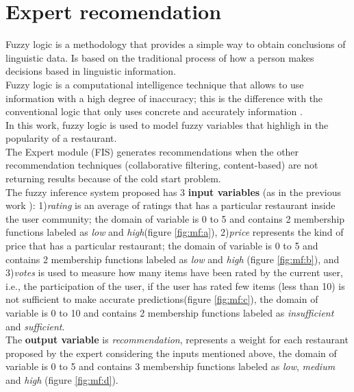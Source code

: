 \section{Expert recomendation} 

Fuzzy logic is a methodology that provides a simple way to obtain
conclusions of linguistic data. Is based on the traditional process of
how a person makes decisions based in linguistic information. \\    Fuzzy
logic is a computational intelligence technique that allows to use
information with a high degree of inaccuracy; this is the difference
with the conventional logic that only uses concrete and accurately
information \cite{zedeh1989knowledge}.\\  In this work, fuzzy logic is
used to model fuzzy variables that highligh in the popularity of a
restaurant.\\   
The Expert module (FIS) generates recommendations when the other
recommendation techniques (collaborative filtering, content-based) are
not returning results because of the cold start problem.\\   The fuzzy
inference system proposed has 3 \textbf{input variables} (as 
in the previous work \cite{garcia2009hybrid}): 1)\textit{rating} is
an average of ratings that has a particular restaurant inside the user
community; the domain of variable is 0 to 5 and contains 2 membership
functions labeled as \textit{low} and \textit{high}(figure
\ref{fig:mf:a}), 2)\textit{price} represents the kind of price that
has a particular restaurant; the domain of variable is 0 to 5 and
contains 2 membership functions labeled as \textit{low} and
\textit{high} (figure \ref{fig:mf:b}), and 3)\textit{votes} is used to
measure how many items have been rated by the current user, i.e., the
participation of the user, if the user has rated few items (less than
10) is not sufficient to make accurate predictions(figure
\ref{fig:mf:c}), the domain of variable is 0 to 10 and contains 2
membership functions labeled as \textit{insufficient} and
\textit{sufficient}. \\ The \textbf{output variable} is
\textit{recommendation}, represents a weight for each restaurant
proposed by the expert considering the inputs mentioned above, the
domain of variable is 0 to 5 and contains 3 membership functions
labeled as \textit{low}, \textit{medium} and \textit{high} (figure
\ref{fig:mf:d}).

